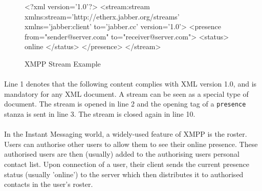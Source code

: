 \begin{figure}[H]
\begin{listing}{1}
<?xml version='1.0'?>
<stream:stream 
      xmlns:stream='http://etherx.jabber.org/streams' 
      xmlns='jabber:client' to='jabber.cc' version='1.0'>
  <presence from="sender@server.com" to="receiver@server.com">
    <status>
      online
    </status>
  </presence>
</stream>
\end{listing}
\caption{XMPP Stream Example}
\label{fig:streamExample}
\end{figure}

\paragraph{}
Line 1 denotes that the following content complies with XML version 1.0, and is mandatory for any XML document. A stream can be seen as a special type of document. The stream is opened in line 2 and the opening tag of a \texttt{presence} stanza is sent in line 3. The stream is closed again in line 10.
\paragraph{}
In the Instant Messaging world, a widely-used feature of XMPP is the roster. Users can authorise other users to allow them to see their online presence. These authorised users are then (usually) added to the authorising users personal contact list. Upon connection of a user, their client sends the current presence status (usually 'online') to the server which then distributes it to authorised contacts in the user's roster.
